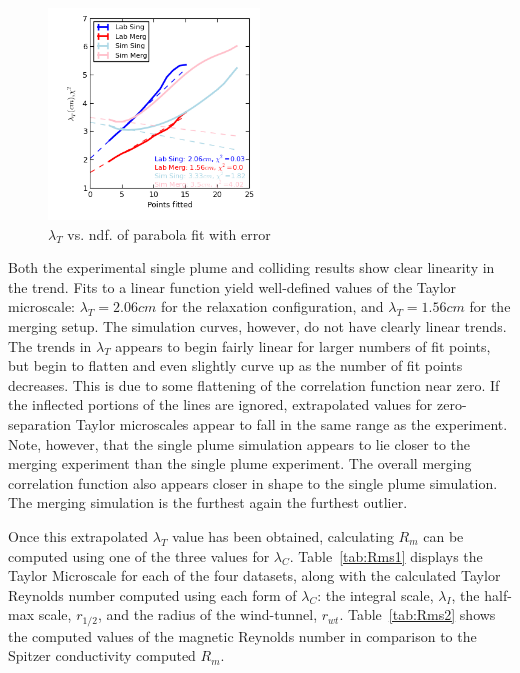 \documentclass[aip,prl,amsmath,amssymb,reprint,superscriptaddress]{revtex4-1} %
\begin{document}
\begin{figure}[!htbp]
\centerline{
\includegraphics[width=0.5\textwidth]{Images/ndf.png}}
\caption{\label{fig:ndf} $\lambda_T$ vs. ndf. of parabola fit with error}
\end{figure}

Both the experimental single plume and colliding results show clear linearity in the trend. Fits to a linear function yield well-defined values of the Taylor microscale: $\lambda_T = 2.06cm$ for the relaxation configuration, and $\lambda_T = 1.56cm$ for the merging setup. The simulation curves, however, do not have clearly linear trends. The trends in $\lambda_{T}$ appears to begin fairly linear for larger numbers of fit points, but begin to flatten and even slightly curve up as the number of fit points decreases. This is due to some flattening of the correlation function near zero. If the inflected portions of the lines are ignored, extrapolated values for zero-separation Taylor microscales appear to fall in the same range as the experiment. Note, however, that the single plume simulation appears to lie closer to the merging experiment than the single plume experiment. The overall merging correlation function also appears closer in shape to the single plume simulation. The merging simulation is the furthest again the furthest outlier.

Once this extrapolated $\lambda_T$ value has been obtained, calculating $R_m$ can be computed using one of the three values for $\lambda_{C}$. Table~\ref{tab:Rms1} displays the Taylor Microscale for each of the four datasets, along with the calculated Taylor Reynolds number computed using each form of $\lambda_{C}$: the integral scale, $\lambda_{I}$, the half-max scale, $r_{1/2}$, and the radius of the wind-tunnel, $r_{wt}$. Table~\ref{tab:Rms2} shows the computed values of the magnetic Reynolds number in comparison to the Spitzer conductivity computed $R_m$.
\end{document}
